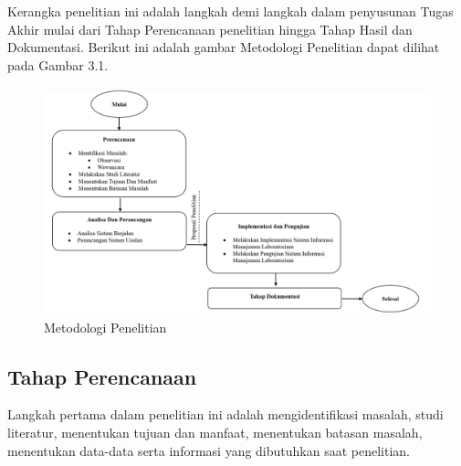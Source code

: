 %
%
%
%


\chapter{\babTiga}
\thispagestyle{fancy} %
Kerangka penelitian ini adalah langkah demi langkah dalam penyusunan Tugas Akhir mulai dari Tahap Perencanaan penelitian hingga Tahap Hasil dan Dokumentasi. Berikut ini adalah gambar Metodologi Penelitian dapat dilihat pada Gambar 3.1.
\begin{figure}
	\centering
	\includegraphics[width=1\linewidth]{konten//gambar/metodologi-penelitian.png}
	\caption{Metodologi Penelitian}
	\label{fig:enter-label}
\end{figure}

\section{Tahap Perencanaan}
Langkah pertama dalam penelitian ini adalah mengidentifikasi masalah, studi literatur, menentukan tujuan dan manfaat, menentukan batasan masalah, menentukan data-data serta informasi yang dibutuhkan saat penelitian.

